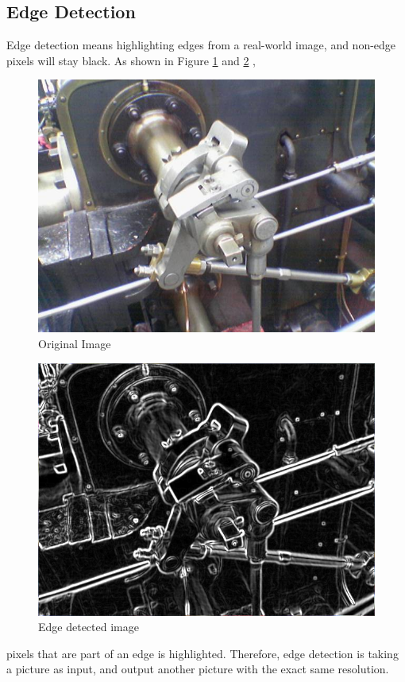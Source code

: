 \documentclass{article}
\begin{document}
	\subsection{Edge Detection}
		Edge detection means highlighting edges from a real-world image, and non-edge pixels will stay black. As shown in Figure \ref{fig:edge1} and \ref{fig:edge2} ,
	\begin{figure}[h]
		\centering
		\includegraphics[scale=0.52]{edge1}
		\caption{Original Image}
		\label{fig:edge1}
	\end{figure} 
	\begin{figure}[h]
		\centering
		\includegraphics[scale=0.52]{edge2}
		\caption{Edge detected image}
		\label{fig:edge2}
	\end{figure}pixels that are part of an edge is highlighted. Therefore, edge detection is taking a picture as input, and output another picture with the exact same resolution.
	\\
	
\end{document}
